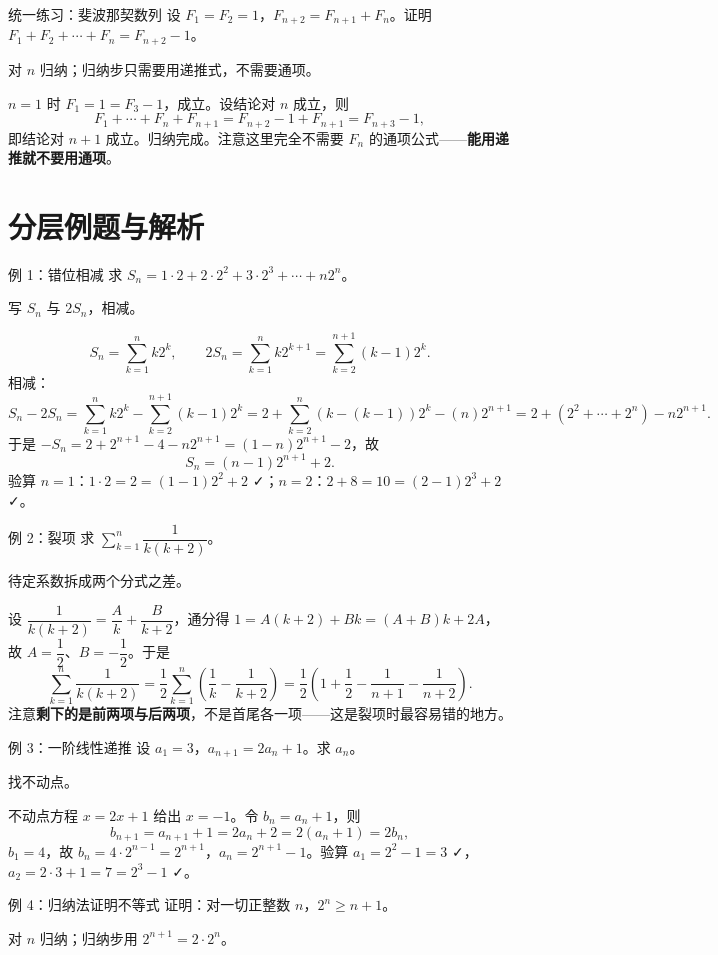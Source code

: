 \begin{problem}{统一练习：斐波那契数列}
设 $F_1=F_2=1$，$F_{n+2}=F_{n+1}+F_n$。证明 $F_1+F_2+\cdots+F_n=F_{n+2}-1$。
\end{problem}
\hint 对 $n$ 归纳；归纳步只需要用递推式，不需要通项。

\sol $n=1$ 时 $F_1=1=F_3-1$，成立。设结论对 $n$ 成立，则
\[
F_1+\cdots+F_n+F_{n+1}=F_{n+2}-1+F_{n+1}=F_{n+3}-1,
\]
即结论对 $n+1$ 成立。归纳完成。注意这里完全不需要 $F_n$ 的通项公式——\textbf{能用递推就不要用通项}。

\section{分层例题与解析}
\begin{problem}{例 1：错位相减}
求 $S_n=1\cdot2+2\cdot2^2+3\cdot2^3+\cdots+n2^n$。
\end{problem}
\hint 写 $S_n$ 与 $2S_n$，相减。

\sol
\[
S_n=\sum_{k=1}^n k2^k,\qquad
2S_n=\sum_{k=1}^n k2^{k+1}=\sum_{k=2}^{n+1}(k-1)2^k.
\]
相减：
\[
S_n-2S_n=\sum_{k=1}^n k2^k-\sum_{k=2}^{n+1}(k-1)2^k
=2+\sum_{k=2}^{n}(k-(k-1))2^k-(n)2^{n+1}
=2+(2^2+\cdots+2^n)-n2^{n+1}.
\]
于是 $-S_n=2+2^{n+1}-4-n2^{n+1}=(1-n)2^{n+1}-2$，故
\[
S_n=(n-1)2^{n+1}+2.
\]
验算 $n=1$：$1\cdot2=2=(1-1)2^2+2$ ✓；$n=2$：$2+8=10=(2-1)2^3+2$ ✓。

\begin{problem}{例 2：裂项}
求 $\sum_{k=1}^n\dfrac1{k(k+2)}$。
\end{problem}
\hint 待定系数拆成两个分式之差。

\sol 设 $\dfrac1{k(k+2)}=\dfrac A{k}+\dfrac B{k+2}$，通分得 $1=A(k+2)+Bk=(A+B)k+2A$，故 $A=\dfrac12$、$B=-\dfrac12$。于是
\[
\sum_{k=1}^n\frac1{k(k+2)}
=\frac12\sum_{k=1}^n\left(\frac1k-\frac1{k+2}\right)
=\frac12\left(1+\frac12-\frac1{n+1}-\frac1{n+2}\right).
\]
注意\textbf{剩下的是前两项与后两项}，不是首尾各一项——这是裂项时最容易错的地方。

\begin{problem}{例 3：一阶线性递推}
设 $a_1=3$，$a_{n+1}=2a_n+1$。求 $a_n$。
\end{problem}
\hint 找不动点。

\sol 不动点方程 $x=2x+1$ 给出 $x=-1$。令 $b_n=a_n+1$，则
\[
b_{n+1}=a_{n+1}+1=2a_n+2=2(a_n+1)=2b_n,
\]
$b_1=4$，故 $b_n=4\cdot2^{n-1}=2^{n+1}$，$a_n=2^{n+1}-1$。验算 $a_1=2^2-1=3$ ✓，$a_2=2\cdot3+1=7=2^3-1$ ✓。

\begin{problem}{例 4：归纳法证明不等式}
证明：对一切正整数 $n$，$2^n\ge n+1$。
\end{problem}
\hint 对 $n$ 归纳；归纳步用 $2^{n+1}=2\cdot2^n$。

